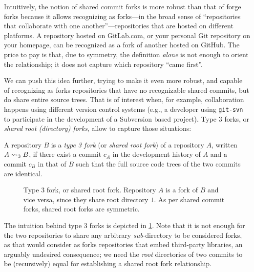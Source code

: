 Intuitively, the notion of shared commit forks is more robust than that of
forge forks because it allows recognizing as forks---in the broad sense of
``repositories that collaborate with one another''---repositories that are
hosted on different platforms. A repository hosted on GitLab.com, or your
personal Git repository on your homepage, can be recognized as a fork of
another hosted on GitHub. The price to pay is that, due to symmetry, the
definition \emph{alone} is not enough to orient the relationship; it does not
capture which repository ``came first''.

We can push this idea further, trying to make it even more robust, and capable
of recognizing as forks repositories that have no recognizable shared commits,
but do share entire source trees. That is of interest when, for example,
collaboration happens using different version control systems (e.g., a
developer using \texttt{git-svn} to participate in the development of a
Subversion based project). Type 3 forks, or \emph{shared root (directory)
forks}, allow to capture those situations:

\begin{definition}%
  \label{def:rootdir-fork}%
  \label{def:type3-fork}
  A repository $B$ is a \emph{type 3 fork} (or \emph{shared root fork}) of a
  repository $A$, written $A\rightsquigarrow_3 B$, if there exist a commit $c_A$ in the
  development history of $A$ and a commit $c_B$ in that of $B$ such that the
  full source code trees of the two commits are identical.
\end{definition}

\begin{figure}[t]
  \centering
  
  \caption{Type 3 fork, or shared root fork. Repository $A$ is a fork of $B$
    and vice versa, since they share root directory $1$.  As per shared commit
    forks, shared root forks are symmetric.}%
  \label{fig:rootdir-fork}%
  \label{fig:type3-fork}
\end{figure}

The intuition behind type 3 forks is depicted in \cref{fig:type3-fork}. Note
that it is not enough for the two repositories to share any arbitrary
\emph{sub}-directory to be considered forks, as that would consider as forks
repositories that embed third-party libraries, an arguably undesired
consequence; we need the \emph{root} directories of two commits to be
(recursively) equal for establishing a shared root fork relationship.

